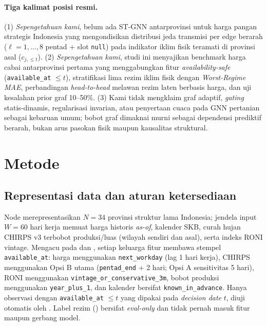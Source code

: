 \documentclass[11pt,a4paper]{article}
\begin{document}
\paragraph{Tiga kalimat posisi resmi.}
(1) \textit{Sepengetahuan kami}, belum ada ST-GNN antarprovinsi untuk harga pangan strategis
Indonesia yang mengondisikan distribusi jeda transmisi per edge berarah ($\ell=1,\dots,8$
pentad + slot \texttt{null}) pada indikator iklim fisik teramati di provinsi asal ($c_{j,\le t}$).
(2) \textit{Sepengetahuan kami}, studi ini menyajikan benchmark harga cabai antarprovinsi
pertama yang menggabungkan fitur \textit{availability-safe} (\texttt{available\_at} $\le t$),
stratifikasi lima rezim iklim fisik dengan \textit{Worst-Regime MAE}, perbandingan
\textit{head-to-head} melawan rezim laten berbasis harga, dan uji kesalahan prior graf 10--50\%.
(3) Kami tidak mengklaim graf adaptif, \textit{gating} statis-dinamis, regularisasi invarian,
atau penyertaan cuaca pada GNN pertanian sebagai kebaruan umum; bobot graf dimaknai murni
sebagai dependensi prediktif berarah, bukan arus pasokan fisik maupun kausalitas struktural.

\section{Metode}
\subsection{Representasi data dan aturan ketersediaan}
Node merepresentasikan $N=34$ provinsi struktur lama Indonesia; jendela input $W=60$ hari
kerja memuat harga historis \textit{as-of}, kalender SKB, curah hujan CHIRPS v3 terbobot
produksi/luas (wilayah sendiri dan asal), serta indeks RONI vintage. Mengacu pada
 dan , setiap keluarga fitur
membawa stempel \texttt{available\_at}: harga menggunakan \texttt{next\_workday} (lag 1 hari
kerja), CHIRPS menggunakan Opsi B utama (\texttt{pentad\_end} + 2 hari; Opsi A sensitivitas
5 hari), RONI menggunakan \texttt{vintage\_or\_conservative\_3m}, bobot produksi menggunakan
\texttt{year\_plus\_1}, dan kalender bersifat \texttt{known\_in\_advance}. Hanya observasi
dengan \texttt{available\_at} $\le t$ yang dipakai pada \textit{decision date} $t$, diuji
otomatis oleh . Label rezim ()
bersifat \textit{eval-only} dan tidak pernah masuk fitur maupun gerbang model.
\end{document}

